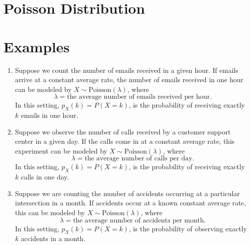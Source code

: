 \documentclass{article}
\begin{document}
\section*{Poisson Distribution}

\section*{Examples}

\begin{enumerate}
    \item Suppose we count the number of emails received in a given hour. If emails arrive at a constant average rate, the number of emails received in one hour can be modeled by \( X \sim \text{Poisson}(\lambda) \), where
    \[
    \lambda = \text{the average number of emails received per hour}.
    \]
    In this setting, \( p_X(k) = P(X = k) \), is the probability of receiving exactly \( k \) emails in one hour.

    \item Suppose we observe the number of calls received by a customer support center in a given day. If the calls come in at a constant average rate, this experiment can be modeled by \( X \sim \text{Poisson}(\lambda) \), where
    \[
    \lambda = \text{the average number of calls per day}.
    \]
    In this setting, \( p_X(k) = P(X = k) \), is the probability of receiving exactly \( k \) calls in one day.

    \item Suppose we are counting the number of accidents occurring at a particular intersection in a month. If accidents occur at a known constant average rate, this can be modeled by \( X \sim \text{Poisson}(\lambda) \), where
    \[
    \lambda = \text{the average number of accidents per month}.
    \]
    In this setting, \( p_X(k) = P(X = k) \), is the probability of observing exactly \( k \) accidents in a month.
\end{enumerate}
\end{document}
